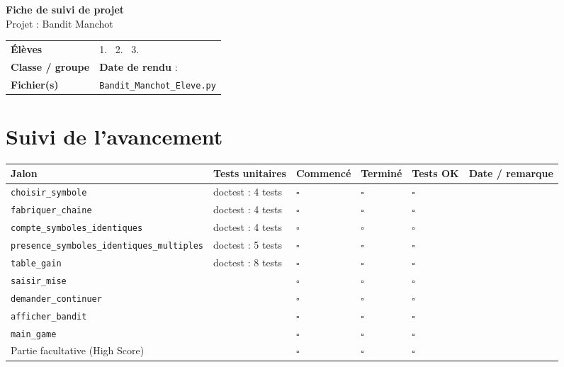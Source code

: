 \documentclass[10pt,a4paper]{article}
\begin{document}
\begin{center}
{\LARGE\bfseries\color{accent} Fiche de suivi de projet}\\[2mm]
{\Large Projet : Bandit Manchot}
\end{center}

\medskip
\begin{tabularx}{\linewidth}{@{}l X@{}}
\textbf{Élèves} & 1. \dotfill\ 2. \dotfill\ 3. \dotfill \\[2mm]
\textbf{Classe / groupe} & \dotfill \hfill \textbf{Date de rendu} : \dotfill \\[2mm]
\textbf{Fichier(s)} & \texttt{Bandit\_Manchot\_Eleve.py} \\
\end{tabularx}

\section*{Suivi de l'avancement}
\begin{tabularx}{\linewidth}{@{}X l C{1.2cm} C{1.2cm} C{1.2cm} l@{}}
\toprule
{} Jalon & Tests unitaires & Commencé & Terminé & Tests OK & Date / remarque \\
\midrule
\texttt{choisir\_\allowbreak{}symbole} & doctest : 4 tests & $\square$ & $\square$ & $\square$ & \\
\texttt{fabriquer\_\allowbreak{}chaine} & doctest : 4 tests & $\square$ & $\square$ & $\square$ & \\
\texttt{compte\_\allowbreak{}symboles\_\allowbreak{}identiques} & doctest : 4 tests & $\square$ & $\square$ & $\square$ & \\
\texttt{presence\_\allowbreak{}symboles\_\allowbreak{}identiques\_\allowbreak{}multiples} & doctest : 5 tests & $\square$ & $\square$ & $\square$ & \\
\texttt{table\_\allowbreak{}gain} & doctest : 8 tests & $\square$ & $\square$ & $\square$ & \\
\texttt{saisir\_\allowbreak{}mise} &  & $\square$ & $\square$ & $\square$ & \\
\texttt{demander\_\allowbreak{}continuer} &  & $\square$ & $\square$ & $\square$ & \\
\texttt{afficher\_\allowbreak{}bandit} &  & $\square$ & $\square$ & $\square$ & \\
\texttt{main\_\allowbreak{}game} &  & $\square$ & $\square$ & $\square$ & \\
Partie facultative (High Score) &  & $\square$ & $\square$ & $\square$ & \\
\bottomrule
\end{tabularx}
\end{document}
